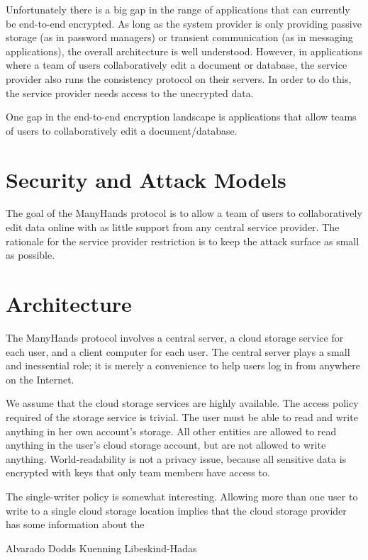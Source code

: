 Unfortunately there is a big gap in the range of applications that can currently be end-to-end encrypted.
As long as the system provider is only providing passive storage (as in password managers) or transient communication (as in messaging applications), the overall architecture is well understood.
However, in applications where a team of users collaboratively edit a document or database, the service provider also runs the consistency protocol on their servers.
In order to do this, the service provider needs access to the unecrypted data.

One gap in the end-to-end encryption landscape is applications that allow teams of users to collaboratively edit a document/database.

\section{Security and Attack Models}

The goal of the ManyHands protocol is to allow a team of users to collaboratively edit data online with as little support from any central service provider.
The rationale for the service provider restriction is to keep the attack surface as small as possible.

\section{Architecture}

The ManyHands protocol involves a central server, a cloud storage service for each user, and a client computer for each user.
The central server plays a small and inessential role; it is merely a convenience to help users log in from anywhere on the Internet.

We assume that the cloud storage services are highly available.
The access policy required of the storage service is trivial.
The user must be able to read and write anything in her own account's storage.
All other entities are allowed to read anything in the user's cloud storage account, but are not allowed to write anything.
World-readability is not a privacy issue, because all sensitive data is encrypted with keys that only team members have access to.

The single-writer policy is somewhat interesting.
Allowing more than one user to write to a single cloud storage location implies that the cloud storage provider has some information about the 



Alvarado Dodds Kuenning Libeskind-Hadas
